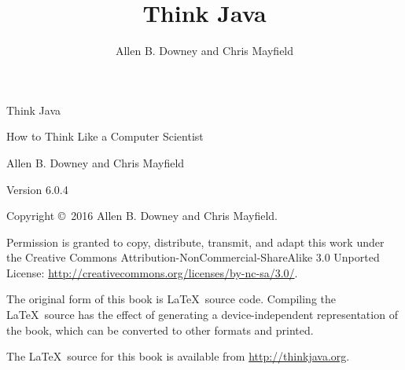 \documentclass[12pt]{book}
\title{Think Java}
\author{Allen B. Downey and Chris Mayfield}
\newcommand{\theauthors}{Allen B. Downey and Chris Mayfield}
\newcommand{\theversion}{Version 6.0.4}
\theoremstyle{exercise}
\newif\ifplastex
\begin{document}
\frontmatter

\ifplastex

\maketitle

\else

\pagebreak
\thispagestyle{empty}

\begin{flushright}
\vspace*{2.0in}

{\huge Think Java}

\vspace{0.25in}
{\LARGE How to Think Like a Computer Scientist}

\vspace{1in}
{\Large \theauthors}

\vspace{1in}
{\large \theversion}

\vfill

\end{flushright}

\pagebreak
\thispagestyle{empty}

Copyright \copyright ~2016 Allen B. Downey and Chris Mayfield.


\vspace{0.25in}

Permission is granted to copy, distribute, transmit, and adapt this work under the Creative Commons Attribution-NonCommercial-ShareAlike 3.0 Unported License: \url{http://creativecommons.org/licenses/by-nc-sa/3.0/}.

The original form of this book is \LaTeX\ source code.
Compiling the \LaTeX\ source has the effect of generating a device-independent representation of the book, which can be converted to other formats and printed.

The \LaTeX\ source for this book is available from \url{http://thinkjava.org}.

\cleardoublepage
\setcounter{tocdepth}{1}
\tableofcontents

\fi
\end{document}
